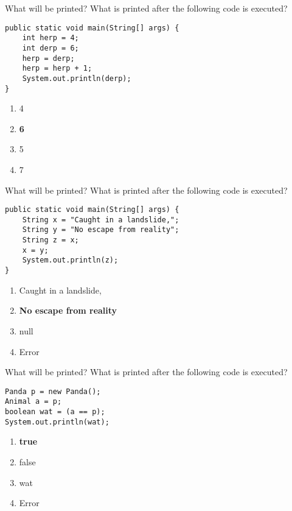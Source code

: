 \documentclass[9pt]{beamer}
\begin{document}
\begin{frame}[fragile]{What will be printed?}
  What is printed after the following code is executed?
  \begin{lstlisting}
public static void main(String[] args) {
    int herp = 4;
    int derp = 6;
    herp = derp;
    herp = herp + 1;
    System.out.println(derp);
}
  \end{lstlisting}
  \begin{enumerate}
    \item
      4
    \item
      \textbf<2>{6}
    \item
      5
    \item
      7
  \end{enumerate}
\end{frame}

\begin{frame}[fragile]{What will be printed?}
  What is printed after the following code is executed?
  \begin{lstlisting}
public static void main(String[] args) {
    String x = "Caught in a landslide,";
    String y = "No escape from reality";
    String z = x;
    x = y;
    System.out.println(z);
}
  \end{lstlisting}
  \begin{enumerate}
    \item
      Caught in a landslide,
    \item
      \textbf<2>{No escape from reality}
    \item
      null
    \item
      Error
  \end{enumerate}
\end{frame}

\begin{frame}[fragile]{What will be printed?}
  What is printed after the following code is executed?
  \begin{lstlisting}
Panda p = new Panda();
Animal a = p;
boolean wat = (a == p);
System.out.println(wat);
  \end{lstlisting}
  \begin{enumerate}
    \item
      \textbf<2>{true}
    \item
      false
    \item
      wat
    \item Error
  \end{enumerate}
\end{frame}
\end{document}

